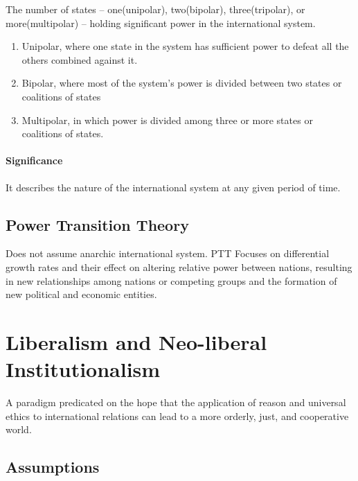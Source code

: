\documentclass[
]{book}
\begin{document}
The number of states -- one(unipolar), two(bipolar), three(tripolar), or more(multipolar) -- holding significant power in the international system.

\begin{enumerate}
\def\labelenumi{\arabic{enumi}.}
\item
  Unipolar, where one state in the system has sufficient power to defeat all the others combined against it.
\item
  Bipolar, where most of the system's power is divided between two states or coalitions of states
\item
  Multipolar, in which power is divided among three or more states or coalitions of states.
\end{enumerate}

\hypertarget{significance-6}{%
\paragraph{Significance}\label{significance-6}}

It describes the nature of the international system at any given period of time.

\hypertarget{power-transition-theory}{%
\subsection{Power Transition Theory}\label{power-transition-theory}}

Does not assume anarchic international system. PTT Focuses on differential growth rates and their effect on altering relative power between nations, resulting in new relationships among nations or competing groups and the formation of new political and economic entities.

\hypertarget{liberalism-and-neo-liberal-institutionalism}{%
\section{Liberalism and Neo-liberal Institutionalism}\label{liberalism-and-neo-liberal-institutionalism}}

A paradigm predicated on the hope that the application of reason and universal ethics to international relations can lead to a more orderly, just, and cooperative world.

\hypertarget{assumptions-1}{%
\subsection{Assumptions}\label{assumptions-1}}
\end{document}
